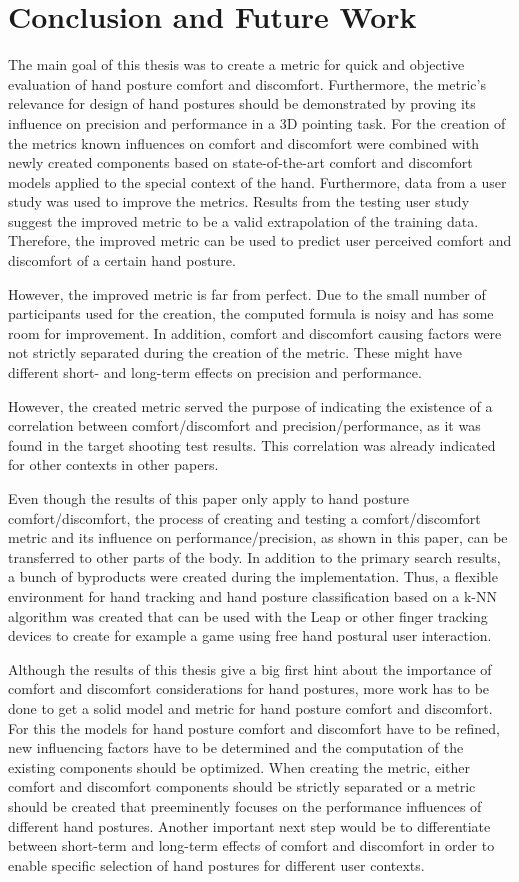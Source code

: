 \chapter{Conclusion and Future Work}\label{chapter:conclusion}

The main goal of this thesis was to create a metric for quick and objective evaluation of hand posture comfort and discomfort. Furthermore, the metric's relevance for design of hand postures should be demonstrated by proving its influence on precision and performance in a 3D pointing task. 
For the creation of the metrics known influences on comfort and discomfort were combined with newly created components based on state-of-the-art comfort and discomfort models applied to the special context of the hand. Furthermore, data from a user study was used to improve the metrics. Results from the testing user study suggest the improved metric to be a valid extrapolation of the training data. Therefore, the improved metric can be used to predict user perceived comfort and discomfort of a certain hand posture.

However, the improved metric is far from perfect. Due to the small number of participants used for the creation, the computed formula is noisy and has some room for improvement. In addition, comfort and discomfort causing factors were not strictly separated during the creation of the metric. These might have different short- and long-term effects on precision and performance. 

However, the created metric served the purpose of indicating the existence of a correlation between comfort/discomfort and precision/performance, as it was found in the target shooting test results. This correlation was already indicated for other contexts in other papers.

Even though the results of this paper only apply to hand posture comfort/discomfort, the process of creating and testing a comfort/discomfort metric and its influence on performance/precision, as shown in this paper, can be transferred to other parts of the body. In addition to the primary search results, a bunch of byproducts were created during the implementation. Thus, a flexible environment for hand tracking and hand posture classification based on a k-NN algorithm was created that can be used with the Leap or other finger tracking devices to create for example a game using free hand postural user interaction.

Although the results of this thesis give a big first hint about the importance of comfort and discomfort considerations for hand postures, more work has to be done to get a solid model and metric for hand posture comfort and discomfort. For this the models for hand posture comfort and discomfort have to be refined, new influencing factors have to be determined and the computation of the existing components should be optimized. When creating the metric, either comfort and discomfort components should be strictly separated or a metric should be created that preeminently focuses on the performance influences of different hand postures. Another important next step would be to differentiate between short-term and long-term effects of comfort and discomfort in order to enable specific selection of hand postures for different user contexts.